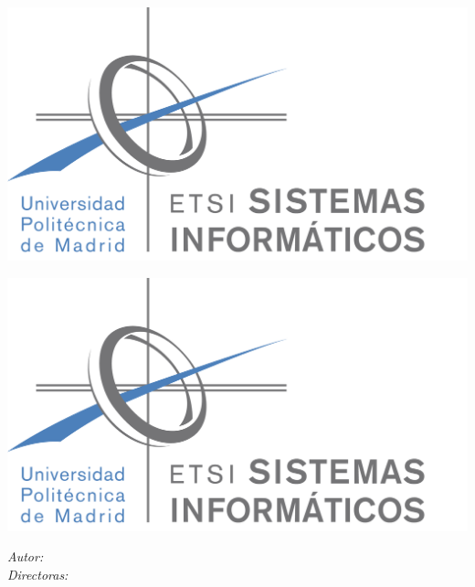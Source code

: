 \begin{titlepage}
  \begin{flushleft}
    \includegraphics[width=.4\linewidth]{imagenes/etsisi.png}
  \end{flushleft}
  
  \begin{center}
    \vspace*{1cm}

    \Huge
    \Course

    \vspace{3.5cm}
    \huge
    \textit{\Title}

    \vfill

    \Large
    \textsc{\ModuleMayus}

    \vspace{2.5cm}

    \Large
    \textit{\Authors}

    \vspace{2cm}

    \EndDate
  \end{center}

  \newpage
  
  \thispagestyle{empty}
  
  \begin{flushleft}
    \includegraphics[width=.4\linewidth]{imagenes/etsisi.png}
  \end{flushleft}

  \begin{center}
    \vspace*{1cm}

    \Huge
    \Course

    \vspace{3.5cm}
    \huge
    \textit{\Title}

    \vfill

    \Large
    \textsc{\ModuleMayus}

    \vspace{2.5cm}

    \Large
    \begin{flushright}
      \textit{Autor: \Authors} \\
      \vspace{0.5cm}
      \textit{Directoras: \Docent} \\
    \end{flushright}

    \vspace{2cm}

    \EndDate
  \end{center}

  \newpage
\end{titlepage}